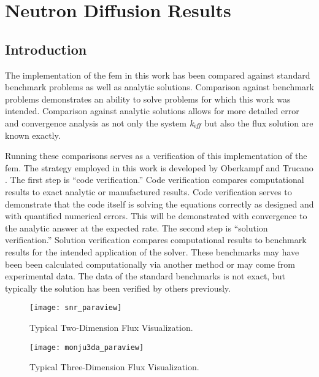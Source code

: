 \chapter{Neutron Diffusion Results}
\label{ch:diffusionResults}

\section{Introduction}
  The implementation of the \gls{fem} in this work has been compared
  against standard benchmark problems as well as analytic solutions. Comparison 
  against benchmark problems demonstrates an ability to solve problems for which 
  this work was intended. Comparison against analytic solutions allows for more 
  detailed error and convergence analysis as not only the system $k_{\!\mbox{\scriptsize \em eff}}$ but 
  also the flux solution are known exactly. 

  Running these comparisons serves as a verification of this implementation of 
  the \gls{fem}. The strategy employed in this work is developed by Oberkampf
  and Trucano \cite{oberkampf}. The first step is 
  ``code verification.'' Code verification compares computational results to 
  exact analytic or manufactured results. Code verification serves to 
  demonstrate that the code itself is solving the equations correctly as 
  designed and with quantified numerical errors. This will be demonstrated with 
  convergence to the analytic answer at the expected rate. The second step is 
  ``solution verification.'' Solution verification compares computational 
  results to benchmark results for the intended application of the solver. These 
  benchmarks may have been been calculated computationally via another method or 
  may come from experimental data.  The data of the standard benchmarks is not 
  exact, but typically the solution has been verified by others previously.

  \begin{figure}
    \centering
    \texttt{[image: snr\_paraview]}
    \caption{Typical Two-Dimension Flux Visualization.}
    \label{fig:snr_paraview}
  \end{figure}

  \begin{figure}
    \centering
    \texttt{[image: monju3da\_paraview]}
    \caption{Typical Three-Dimension Flux Visualization.}
    \label{fig:monju3da_paraview}
  \end{figure}

